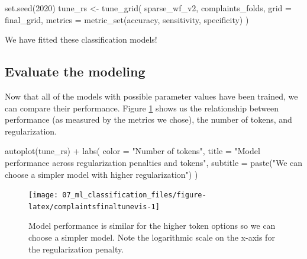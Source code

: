 \documentclass[
]{krantz}
\makeatletter
\newenvironment{Shaded}{\begin{snugshade}}{\end{snugshade}}
\newcommand{\AttributeTok}[1]{\textcolor[rgb]{0.77,0.63,0.00}{#1}}
\newcommand{\DecValTok}[1]{\textcolor[rgb]{0.00,0.00,0.81}{#1}}
\newcommand{\FunctionTok}[1]{\textcolor[rgb]{0.00,0.00,0.00}{#1}}
\newcommand{\NormalTok}[1]{#1}
\newcommand{\OtherTok}[1]{\textcolor[rgb]{0.56,0.35,0.01}{#1}}
\newcommand{\SpecialCharTok}[1]{\textcolor[rgb]{0.00,0.00,0.00}{#1}}
\newcommand{\StringTok}[1]{\textcolor[rgb]{0.31,0.60,0.02}{#1}}
\newenvironment{kframe}{%
\medskip{}
\setlength{\fboxsep}{.8em}
 \def\at@end@of@kframe{}%
 \ifinner\ifhmode%
  \def\at@end@of@kframe{\end{minipage}}%
  \begin{minipage}{\columnwidth}%
 \fi\fi%
 \def\FrameCommand##1{\hskip\@totalleftmargin \hskip-\fboxsep
 \colorbox{shadecolor}{##1}\hskip-\fboxsep
     \hskip-\linewidth \hskip-\@totalleftmargin \hskip\columnwidth}%
 \MakeFramed {\advance\hsize-\width
   \@totalleftmargin\z@ \linewidth\hsize
   \@setminipage}}%
 {\par\unskip\endMakeFramed%
 \at@end@of@kframe}
\renewenvironment{Shaded}{\begin{kframe}}{\end{kframe}}
\makeatother
\begin{document}
\begin{Shaded}
\begin{Highlighting}[]
\FunctionTok{set.seed}\NormalTok{(}\DecValTok{2020}\NormalTok{)}
\NormalTok{tune\_rs }\OtherTok{\textless{}{-}} \FunctionTok{tune\_grid}\NormalTok{(}
\NormalTok{  sparse\_wf\_v2,}
\NormalTok{  complaints\_folds,}
  \AttributeTok{grid =}\NormalTok{ final\_grid,}
  \AttributeTok{metrics =} \FunctionTok{metric\_set}\NormalTok{(accuracy, sensitivity, specificity)}
\NormalTok{)}
\end{Highlighting}
\end{Shaded}

We have fitted these classification models!

\hypertarget{classification-final-evaluation}{%
\subsection{Evaluate the modeling}\label{classification-final-evaluation}}

Now that all of the models with possible parameter values have been trained, we can compare their performance. Figure \ref{fig:complaintsfinaltunevis} shows us the relationship between performance (as measured by the metrics we chose), the number of tokens, and regularization.

\begin{Shaded}
\begin{Highlighting}[]
\FunctionTok{autoplot}\NormalTok{(tune\_rs) }\SpecialCharTok{+}
  \FunctionTok{labs}\NormalTok{(}
    \AttributeTok{color =} \StringTok{"Number of tokens"}\NormalTok{,}
    \AttributeTok{title =} \StringTok{"Model performance across regularization penalties and tokens"}\NormalTok{,}
    \AttributeTok{subtitle =} \FunctionTok{paste}\NormalTok{(}\StringTok{"We can choose a simpler model with higher regularization"}\NormalTok{)}
\NormalTok{  )}
\end{Highlighting}
\end{Shaded}

\begin{figure}

{\centering \texttt{[image: 07\_ml\_classification\_files/figure-latex/complaintsfinaltunevis-1]} 

}

\caption{Model performance is similar for the higher token options so we can choose a simpler model. Note the logarithmic scale on the x-axis for the regularization penalty.}\label{fig:complaintsfinaltunevis}
\end{figure}
\end{document}
